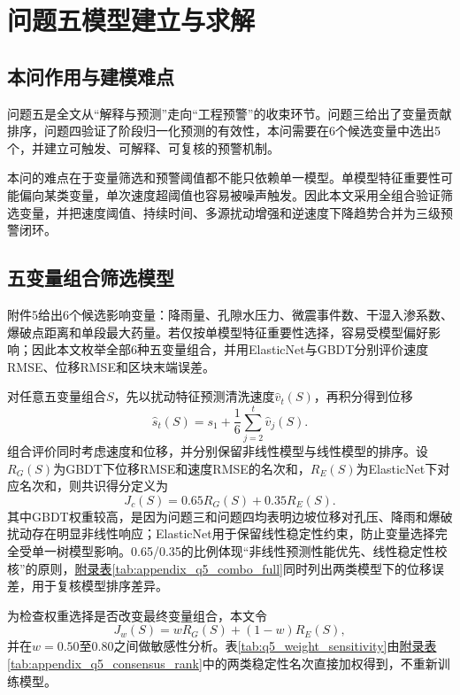 \chapter{问题五模型建立与求解}

\section{本问作用与建模难点}

问题五是全文从“解释与预测”走向“工程预警”的收束环节。问题三给出了变量贡献排序，问题四验证了阶段归一化预测的有效性，本问需要在6个候选变量中选出5个，并建立可触发、可解释、可复核的预警机制。

本问的难点在于变量筛选和预警阈值都不能只依赖单一模型。单模型特征重要性可能偏向某类变量，单次速度超阈值也容易被噪声触发。因此本文采用全组合验证筛选变量，并把速度阈值、持续时间、多源扰动增强和逆速度下降趋势合并为三级预警闭环。

\section{五变量组合筛选模型}

附件5给出6个候选影响变量：降雨量、孔隙水压力、微震事件数、干湿入渗系数、爆破点距离和单段最大药量。若仅按单模型特征重要性选择，容易受模型偏好影响；因此本文枚举全部6种五变量组合，并用ElasticNet与GBDT分别评价速度RMSE、位移RMSE和区块末端误差。

对任意五变量组合$S$，先以扰动特征预测清洗速度$\hat v_t(S)$，再积分得到位移
\begin{equation}
  \hat s_t(S)=s_1+\frac{1}{6}\sum_{j=2}^{t}\hat v_j(S).
\end{equation}
组合评价同时考虑速度和位移，并分别保留非线性模型与线性模型的排序。设$R_G(S)$为GBDT下位移RMSE和速度RMSE的名次和，$R_E(S)$为ElasticNet下对应名次和，则共识得分定义为
\begin{equation}
  J_c(S)=0.65R_G(S)+0.35R_E(S).
\end{equation}
其中GBDT权重较高，是因为问题三和问题四均表明边坡位移对孔压、降雨和爆破扰动存在明显非线性响应；ElasticNet用于保留线性稳定性约束，防止变量选择完全受单一树模型影响。0.65/0.35的比例体现“非线性预测性能优先、线性稳定性校核”的原则，\hyperref[tab:appendix_q5_combo_full]{附录表\ref*{tab:appendix_q5_combo_full}}同时列出两类模型下的位移误差，用于复核模型排序差异。

为检查权重选择是否改变最终变量组合，本文令
\begin{equation}
  J_w(S)=wR_G(S)+(1-w)R_E(S),
\end{equation}
并在$w=0.50$至$0.80$之间做敏感性分析。表\ref{tab:q5_weight_sensitivity}由\hyperref[tab:appendix_q5_consensus_rank]{附录表\ref*{tab:appendix_q5_consensus_rank}}中的两类稳定性名次直接加权得到，不重新训练模型。

